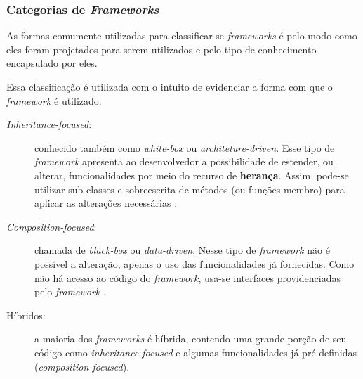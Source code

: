 \subsubsection{Categorias de \textit{Frameworks}}
As formas comumente utilizadas para classificar-se \textit{frameworks} é pelo modo como eles foram projetados para serem utilizados e pelo tipo de conhecimento encapsulado por eles.

Essa classificação é utilizada com o intuito de evidenciar a forma com que o \textit{framework} é utilizado.
\begin{description}
\item[\textit{Inheritance-focused}:] conhecido também como \textit{white-box} ou \textit{architeture-driven}. Esse tipo de \textit{framework} apresenta ao desenvolvedor a possibilidade de estender, ou alterar, funcionalidades por meio do recurso de \textbf{herança}. Assim, pode-se utilizar sub-classes e sobreescrita de métodos (ou funções-membro) para aplicar as alterações necessárias \cite{sauve2006}.
\item[\textit{Composition-focused}:] chamada de \textit{black-box} ou \textit{data-driven}. Nesse tipo de \textit{framework}  não é possível a alteração, apenas o uso das funcionalidades já fornecidas. Como não há acesso ao código do \textit{framework}, usa-se interfaces providenciadas pelo \textit{framework} \cite{sauve2006}.
\item[Híbridos:] a maioria dos \textit{frameworks} é híbrida, contendo uma grande porção de seu código como \textit{inheritance-focused} e algumas funcionalidades já pré-definidas (\textit{composition-focused}).
\end{description}

